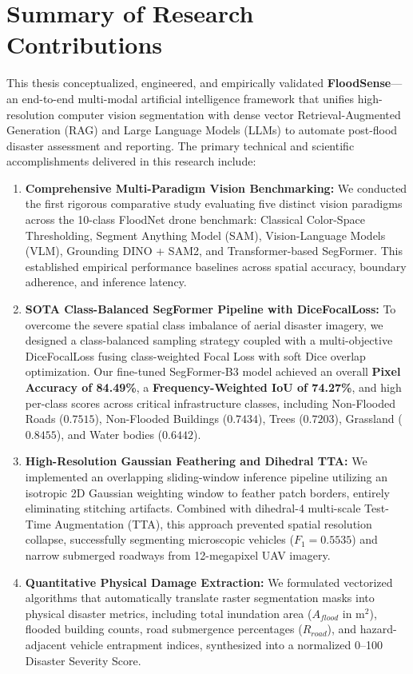 \label{chap:conclusion}

\section{Summary of Research Contributions}
This thesis conceptualized, engineered, and empirically validated \textbf{FloodSense}—an end-to-end multi-modal artificial intelligence framework that unifies high-resolution computer vision segmentation with dense vector Retrieval-Augmented Generation (RAG) and Large Language Models (LLMs) to automate post-flood disaster assessment and reporting. The primary technical and scientific accomplishments delivered in this research include:

\begin{enumerate}
    \item \textbf{Comprehensive Multi-Paradigm Vision Benchmarking:} We conducted the first rigorous comparative study evaluating five distinct vision paradigms across the 10-class FloodNet drone benchmark: Classical Color-Space Thresholding, Segment Anything Model (SAM), Vision-Language Models (VLM), Grounding DINO + SAM2, and Transformer-based SegFormer. This established empirical performance baselines across spatial accuracy, boundary adherence, and inference latency.
    \item \textbf{SOTA Class-Balanced SegFormer Pipeline with DiceFocalLoss:} To overcome the severe spatial class imbalance of aerial disaster imagery, we designed a class-balanced sampling strategy coupled with a multi-objective DiceFocalLoss fusing class-weighted Focal Loss with soft Dice overlap optimization. Our fine-tuned SegFormer-B3 model achieved an overall \textbf{Pixel Accuracy of 84.49\%}, a \textbf{Frequency-Weighted IoU of 74.27\%}, and high per-class scores across critical infrastructure classes, including Non-Flooded Roads ($0.7515$), Non-Flooded Buildings ($0.7434$), Trees ($0.7203$), Grassland ($0.8455$), and Water bodies ($0.6442$).
    \item \textbf{High-Resolution Gaussian Feathering and Dihedral TTA:} We implemented an overlapping sliding-window inference pipeline utilizing an isotropic 2D Gaussian weighting window to feather patch borders, entirely eliminating stitching artifacts. Combined with dihedral-4 multi-scale Test-Time Augmentation (TTA), this approach prevented spatial resolution collapse, successfully segmenting microscopic vehicles ($F_1 = 0.5535$) and narrow submerged roadways from 12-megapixel UAV imagery.
    \item \textbf{Quantitative Physical Damage Extraction:} We formulated vectorized algorithms that automatically translate raster segmentation masks into physical disaster metrics, including total inundation area ($A_{flood}$ in $\text{m}^2$), flooded building counts, road submergence percentages ($R_{road}$), and hazard-adjacent vehicle entrapment indices, synthesized into a normalized 0--100 Disaster Severity Score.

\end{enumerate}
